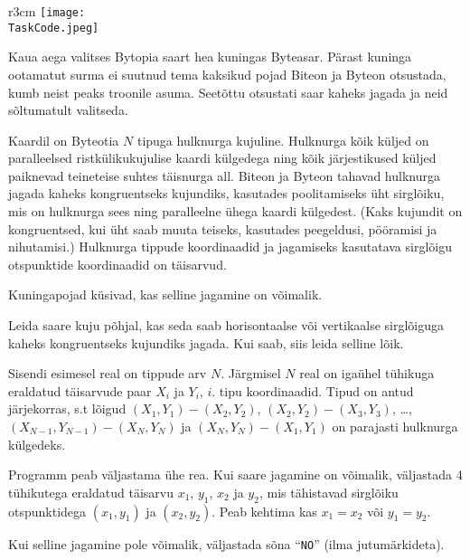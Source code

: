 ﻿\documentclass{boi2014-et}
\renewcommand{\TaskCode}{demarcation}
\newcommand{\constant}[1]{{\tt #1}}
\begin{document}
    \begin{wrapfigure}{r}{3cm}
        \vspace{-24pt}
        \texttt{[image: \\TaskCode.jpeg]}
    \end{wrapfigure}

    Kaua aega valitses Bytopia saart hea kuningas Byteasar.
    Pärast kuninga ootamatut surma ei suutnud tema kaksikud pojad
    Biteon ja Byteon otsustada, kumb neist peaks troonile asuma.
    Seetõttu otsustati saar kaheks jagada ja neid sõltumatult valitseda.

    Kaardil on Byteotia $N$ tipuga hulknurga kujuline.
    Hulknurga kõik küljed on paralleelsed ristkülikukujulise kaardi külgedega ning
    kõik järjestikused küljed paiknevad teineteise suhtes täisnurga all.
    Biteon ja Byteon tahavad hulknurga jagada kaheks kongruentseks kujundiks,
    kasutades poolitamiseks üht sirglõiku,
    mis on hulknurga sees ning paralleelne ühega kaardi külgedest.
    (Kaks kujundit on kongruentsed, kui üht saab muuta teiseks,
    kasutades peegeldusi, pööramisi ja nihutamisi.)
    Hulknurga tippude koordinaadid ja jagamiseks
    kasutatava sirglõigu otspunktide koordinaadid on täisarvud.

    Kuningapojad küsivad, kas selline jagamine on võimalik.

    \Task

    Leida saare kuju põhjal, kas seda saab horisontaalse või vertikaalse sirglõiguga
    kaheks kongruentseks kujundiks jagada.
    Kui saab, siis leida selline lõik.

    \Input

    Sisendi esimesel real on tippude arv $N$.
    Järgmisel $N$ real on igaühel tühikuga eraldatud täisarvude paar
    $X_i$ ja $Y_i$, $i$. tipu koordinaadid.
    Tipud on antud järjekorras, s.t lõigud $(X_1,Y_1) - (X_2,Y_2)$,
    $(X_2,Y_2) - (X_3,Y_3)$, \ldots, $(X_{N-1},Y_{N-1}) - (X_N,Y_N)$ ja
    $(X_N,Y_N) - (X_1,Y_1)$ on parajasti hulknurga külgedeks.

    \Output

    Programm peab väljastama ühe rea.
    Kui saare jagamine on võimalik, väljastada 4 tühikutega eraldatud täisarvu
    $x_1$, $y_1$, $x_2$ ja $y_2$, mis tähistavad sirglõiku otspunktidega
    $(x_1, y_1)$ ja $(x_2, y_2)$.
    Peab kehtima kas $x_1 = x_2$ või $y_1 = y_2$.

    Kui selline jagamine pole võimalik, väljastada sõna
    ``\constant{NO}'' (ilma jutumärkideta).
\end{document}

